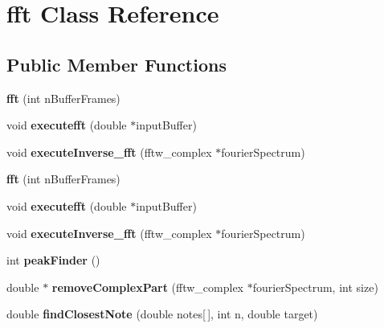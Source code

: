 \hypertarget{classfft}{\section{fft Class Reference}
\label{classfft}
}
\subsection*{Public Member Functions}
\begin{DoxyCompactItemize}
\item 
\hypertarget{classfft_a5fff94ac07119207ddd05f628be5891d}{{\bfseries fft} (int n\-Buffer\-Frames)}\label{classfft_a5fff94ac07119207ddd05f628be5891d}

\item 
\hypertarget{classfft_a47e58fd4f715ad89a6fad8df9d715bf4}{void {\bfseries executefft} (double $\ast$input\-Buffer)}\label{classfft_a47e58fd4f715ad89a6fad8df9d715bf4}

\item 
\hypertarget{classfft_a228bd861564c189cd7b6800c950a1c09}{void {\bfseries execute\-Inverse\-\_\-fft} (fftw\-\_\-complex $\ast$fourier\-Spectrum)}\label{classfft_a228bd861564c189cd7b6800c950a1c09}

\item 
\hypertarget{classfft_a5fff94ac07119207ddd05f628be5891d}{{\bfseries fft} (int n\-Buffer\-Frames)}\label{classfft_a5fff94ac07119207ddd05f628be5891d}

\item 
\hypertarget{classfft_a47e58fd4f715ad89a6fad8df9d715bf4}{void {\bfseries executefft} (double $\ast$input\-Buffer)}\label{classfft_a47e58fd4f715ad89a6fad8df9d715bf4}

\item 
\hypertarget{classfft_a228bd861564c189cd7b6800c950a1c09}{void {\bfseries execute\-Inverse\-\_\-fft} (fftw\-\_\-complex $\ast$fourier\-Spectrum)}\label{classfft_a228bd861564c189cd7b6800c950a1c09}

\item 
\hypertarget{classfft_acd506cabf787a130ba123c29224f5488}{int {\bfseries peak\-Finder} ()}\label{classfft_acd506cabf787a130ba123c29224f5488}

\item 
\hypertarget{classfft_a643182c5ca6b24b40c1e8744fc953953}{double $\ast$ {\bfseries remove\-Complex\-Part} (fftw\-\_\-complex $\ast$fourier\-Spectrum, int size)}\label{classfft_a643182c5ca6b24b40c1e8744fc953953}

\item 
\hypertarget{classfft_aa7a241b05f62358ba02a94972edf3a7e}{double {\bfseries find\-Closest\-Note} (double notes\mbox{[}$\,$\mbox{]}, int n, double target)}\label{classfft_aa7a241b05f62358ba02a94972edf3a7e}


\end{DoxyCompactItemize}
